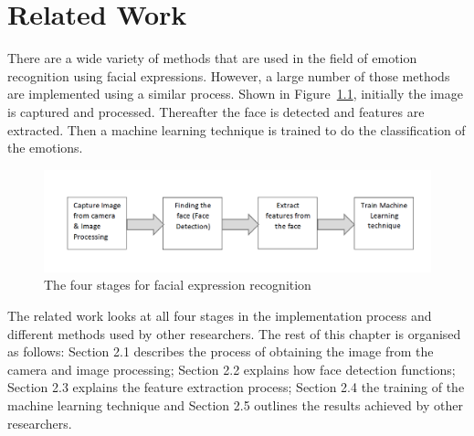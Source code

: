 \chapter{Related Work}

There are a wide variety of methods that are used in the field of emotion recognition using facial expressions. However, a large number of those methods are implemented using a similar process. Shown in Figure~\ref{fig:process}, initially the image is captured and processed. Thereafter the face is detected and features are extracted. Then a machine learning technique is trained to do the classification of the emotions. 
\begin{figure}[ht]
  \centering
  \includegraphics[scale=0.6]{4}
  \caption{The four stages for facial expression recognition}
  \label{fig:process}
\end{figure}
The related work looks at all four stages in the implementation process and different methods used by other researchers. The rest of this chapter is organised as follows: Section 2.1 describes the process of obtaining the image from the camera and image processing; Section 2.2 explains how face detection functions; Section 2.3 explains the feature extraction process; Section 2.4 the training of the machine learning technique and Section 2.5 outlines the results achieved by other researchers.
